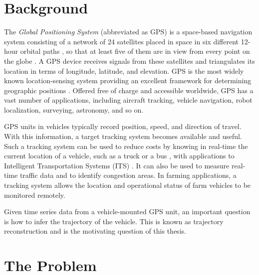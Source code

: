
\section{Background}


The \textit{Global Positioning System} (abbreviated as GPS) is a space-based navigation system consisting of a network of 24 satellites placed in space in six different 12-hour orbital paths \citep{agrawal2015introduction}, so that at least five of them are in view from every point on the globe \citep{kaplan2005understanding, bajaj2002gps}. A GPS device receives signals from these satellites and triangulates its location in terms of longitude, latitude, and elevation. GPS is the most widely known location-sensing system providing an excellent framework for determining geographic positions \citep{hightower2001location}. Offered free of charge and accessible worldwide, GPS has a vast number of applications, including aircraft tracking, vehicle navigation, robot localization, surveying, astronomy, and so on. 

GPS units in vehicles typically record position, speed, and direction of travel. With this information, a target tracking system becomes available and useful. Such a tracking system can be used to reduce costs by knowing in real-time the current location of a vehicle, such as a truck or a bus \citep{chadil2008real}, with applications to  Intelligent Transportation Systems (ITS) \citep{mcdonald2006intelligent}. It can also be used to measure real-time traffic data and to identify congestion areas. In farming applications, a tracking system allows the location and operational status of farm vehicles to be monitored remotely. 




Given time series data from a vehicle-mounted GPS unit, an important question is how to infer the trajectory of the vehicle. This is known as trajectory reconstruction and is the motivating question of this thesis. 




\section{The Problem}

